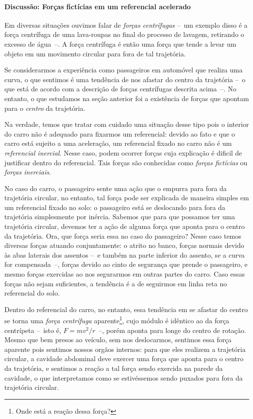 \paragraph{Discussão: Forças fictícias em um referencial acelerado}

Em diversas situações ouvimos falar de \emph{forças centrífugas} --~um exemplo disso é a força centrífuga de uma lava-roupas no final do processo de lavagem, retirando o excesso de água~--. A força centrífuga é então uma força que tende a levar um objeto em um movimento circular para fora de tal trajetória.

Se considerarmos a experiência como passageiros em automóvel que realiza uma curva, o que sentimos é uma tendência de nos afastar do centro da trajetória --~o que está de acordo com a descrição de forças centrífugas descrita acima~--. No entanto, o que estudamos na seção anterior foi a existência de forças que apontam para o \emph{centro} da trajetória.

Na verdade, temos que tratar com cuidado uma situação desse tipo pois o interior do carro não é adequado para fixarmos um referencial: devido ao fato e que o carro está sujeito a uma aceleração, um referencial fixado no carro não é um \emph{referencial inercial}. Nesse caso, podem ocorrer forças cuja explicação é dificil de justificar dentro do referencial. Tais forças são conhecidas como \emph{forças fictícias} ou \emph{forças inerciais}.

No caso do carro, o passageiro sente uma ação que o empurra para fora da trajetória circular, no entanto, tal força pode ser explicada de maneira simples em um referencial fixado no solo: o passageiro está se deslocando para fora da trajetória simplesmente por inércia. Sabemos que para que possamos ter uma trajetória circular, devemos ter a ação de alguma força que aponta para o centro da trajetória. Ora, que força seria essa no caso do passageiro? Nesse caso temos diversas forças atuando conjuntamente: o atrito no banco, forças normais devido às abas laterais dos assentos --~e também na parte inferior do assento, se a curva for compensada~--, forças devido ao cinto de segurança que prende o passageiro, e mesmo forças exercidas ao nos segurarmos em outras partes do carro. Caso essas forças não sejam suficientes, a tendência é a de seguirmos em linha reta no referencial do solo.

Dentro do referencial do carro, no entanto, essa tendência em se afastar do centro se torna uma \emph{força centrífuga} aparente\footnote{Onde está a reação dessa força?}, cujo módulo é idêntico ao da força centrípeta --~isto é, $F = mv^2/r$~--, porém aponta para longe do centro de rotação. Mesmo que bem presos ao veículo, sem nos deslocarmos, sentimos essa força aparente pois sentimos nossos orgãos internos: para que eles realizem a trajetória circular, a cavidade abdominal deve exercer uma força que aponta para o centro da trajetória, e sentimos a reação a tal força sendo exercida na parede da cavidade, o que interpretamos como se estivéssemos sendo puxados para fora da trajetória circular.

